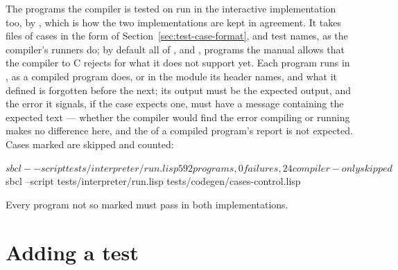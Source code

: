 The programs the compiler is tested on run in the interactive
implementation too, by , which is how
the two implementations are kept in agreement. It takes files of cases in
the form of Section~\ref{sec:test-case-format}, and test names, as the
compiler's runners do; by default all of ,
and , programs the manual allows that
the compiler to C rejects for what it does not support yet.
Each program runs in , as a compiled program does, or
in the module its  header names, and what it defined is
forgotten before the next; its output must be the
expected output, and the error it signals, if the case expects one, must
have a message containing the expected text --- whether the compiler
would find the error compiling or running makes no difference here, and
the  of a compiled program's report is not expected.
Cases marked  are skipped and counted:

\begin{shell}
$ sbcl --script tests/interpreter/run.lisp
592 programs, 0 failures, 24 compiler-only skipped
$ sbcl --script tests/interpreter/run.lisp tests/codegen/cases-control.lisp
\end{shell}

Every program not so marked must pass in both implementations.

\section{Adding a test}\label{sec:test-adding}


